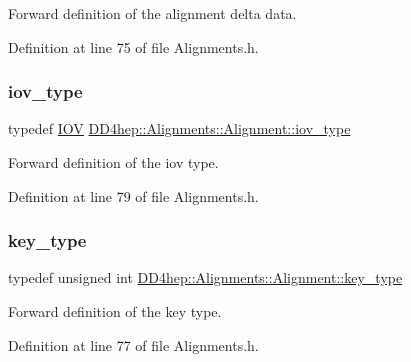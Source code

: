 Forward definition of the alignment delta data. 



Definition at line 75 of file Alignments.\+h.

\hypertarget{class_d_d4hep_1_1_alignments_1_1_alignment_afd988c803da5a514d8fa255784f29462}{}\label{class_d_d4hep_1_1_alignments_1_1_alignment_afd988c803da5a514d8fa255784f29462} 
\subsubsection{\texorpdfstring{iov\+\_\+type}{iov\_type}}
{\footnotesize\ttfamily typedef \hyperlink{class_d_d4hep_1_1_i_o_v}{I\+OV} \hyperlink{class_d_d4hep_1_1_alignments_1_1_alignment_afd988c803da5a514d8fa255784f29462}{D\+D4hep\+::\+Alignments\+::\+Alignment\+::iov\+\_\+type}}



Forward definition of the iov type. 



Definition at line 79 of file Alignments.\+h.

\hypertarget{class_d_d4hep_1_1_alignments_1_1_alignment_ab824a65f935a0c79b9ea1a7a85014b88}{}\label{class_d_d4hep_1_1_alignments_1_1_alignment_ab824a65f935a0c79b9ea1a7a85014b88} 
\subsubsection{\texorpdfstring{key\+\_\+type}{key\_type}}
{\footnotesize\ttfamily typedef unsigned int \hyperlink{class_d_d4hep_1_1_alignments_1_1_alignment_ab824a65f935a0c79b9ea1a7a85014b88}{D\+D4hep\+::\+Alignments\+::\+Alignment\+::key\+\_\+type}}



Forward definition of the key type. 



Definition at line 77 of file Alignments.\+h.

\hypertarget{class_d_d4hep_1_1_alignments_1_1_alignment_a83282984664b4e1117f46d8a8bc40cb7}{}\label{class_d_d4hep_1_1_alignments_1_1_alignment_a83282984664b4e1117f46d8a8bc40cb7} 
